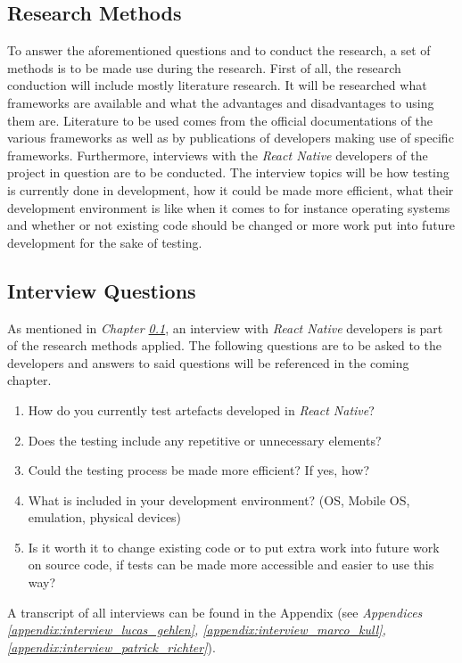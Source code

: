 \subsection{Research Methods}
\label{ssec:research_methods}

To answer the aforementioned questions and to conduct the research, a set of methods is to be made use during the research. First of all, the research conduction will include mostly literature research. It will be researched what frameworks are available and what the advantages and disadvantages to using them are. Literature to be used comes from the official documentations of the various frameworks as well as by publications of developers making use of specific frameworks.
\newline
Furthermore, interviews with the \textit{React Native} developers of the project in question are to be conducted. The interview topics will be how testing is currently done in development, how it could be made more efficient, what their development environment is like when it comes to for instance operating systems and whether or not existing code should be changed or more work put into future development for the sake of testing.

\subsection{Interview Questions}
\label{ssec:interview_questions}

As mentioned in \textit{Chapter \ref{ssec:research_methods}}, an interview with \textit{React Native} developers is part of the research methods applied. The following questions are to be asked to the developers and answers to said questions will be referenced in the coming chapter.

\begin{enumerate}
\item How do you currently test artefacts developed in \textit{React Native}?
\item Does the testing include any repetitive or unnecessary elements?
\item Could the testing process be made more efficient? If yes, how?
\item What is included in your development environment? (OS, Mobile OS, emulation, physical devices)
\item Is it worth it to change existing code or to put extra work into future work on source code, if tests can be made more accessible and easier to use this way?
\end{enumerate}

A transcript of all interviews can be found in the Appendix (see \textit{Appendices \ref{appendix:interview_lucas_gehlen}, \ref{appendix:interview_marco_kull}, \ref{appendix:interview_patrick_richter}}).